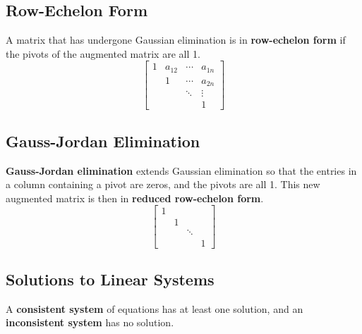 \documentclass{article}
\begin{document}
\subsection{Row-Echelon Form}
\begin{definition}
    A matrix that has undergone Gaussian elimination is in
    \textbf{row-echelon form} if the pivots of the augmented matrix are
    all 1.
    \begin{equation*}
        \begin{bmatrix}
            1 & a_{12} & \cdots & a_{1n} \\
              & 1      & \cdots & a_{2n} \\
              &        & \ddots & \vdots \\
              &        &        & 1
        \end{bmatrix}
    \end{equation*}
\end{definition}
\subsection{Gauss-Jordan Elimination}
\begin{definition}
    \textbf{Gauss-Jordan elimination} extends Gaussian elimination so
    that the entries in a column containing a pivot are zeros, and the
    pivots are all 1. This new augmented matrix is then in
    \textbf{reduced row-echelon form}.
    \begin{equation*}
        \begin{bmatrix}
            1 &   &        &   \\
              & 1 &        &   \\
              &   & \ddots &   \\
              &   &        & 1
        \end{bmatrix}
    \end{equation*}
\end{definition}
\subsection{Solutions to Linear Systems}
\begin{definition}
    A \textbf{consistent system} of equations has at least one solution,
    and an \linebreak \textbf{inconsistent system} has no solution.
\end{definition}
\end{document}
